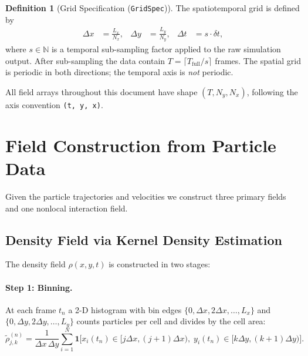 \documentclass[11pt, letterpaper]{article}
\theoremstyle{definition}
\newtheorem{definition}{Definition}[section]
\newcommand{\N}{\mathbb{N}}
\begin{document}
\begin{definition}[Grid Specification (\texttt{GridSpec})]
\label{def:gridspec}
The spatiotemporal grid is defined by
\begin{align}
  \Delta x &= \frac{L_x}{N_x}, &
  \Delta y &= \frac{L_y}{N_y}, &
  \Delta t &= s \cdot \delta t,
\end{align}
where $s \in \N$ is a temporal sub-sampling factor applied to the raw
simulation output.  After sub-sampling the data contain
$T = \lceil T_{\mathrm{full}} / s \rceil$ frames.
The spatial grid is periodic in both directions; the temporal axis is
\emph{not} periodic.
\end{definition}

All field arrays throughout this document have shape $(T, N_y, N_x)$,
following the axis convention \texttt{(t, y, x)}.

\section{Field Construction from Particle Data}
\label{sec:fields}

Given the particle trajectories and velocities we construct three
primary fields and one nonlocal interaction field.

\subsection{Density Field via Kernel Density Estimation}
\label{sec:kde-density}

The density field $\rho(x, y, t)$ is constructed in two stages:

\paragraph{Step 1: Binning.}
At each frame $t_n$ a 2-D histogram with bin edges
$\{0, \Delta x, 2\Delta x, \dots, L_x\}$ and
$\{0, \Delta y, 2\Delta y, \dots, L_y\}$ counts particles per cell
and divides by the cell area:
\begin{equation}
  \tilde{\rho}_{j,k}^{(n)}
  = \frac{1}{\Delta x \, \Delta y}
    \sum_{i=1}^{N}
    \mathbf{1}\!\bigl[
      x_i(t_n) \in [j\Delta x, (j\!+\!1)\Delta x),\;
      y_i(t_n) \in [k\Delta y, (k\!+\!1)\Delta y)
    \bigr].
\end{equation}
\end{document}

